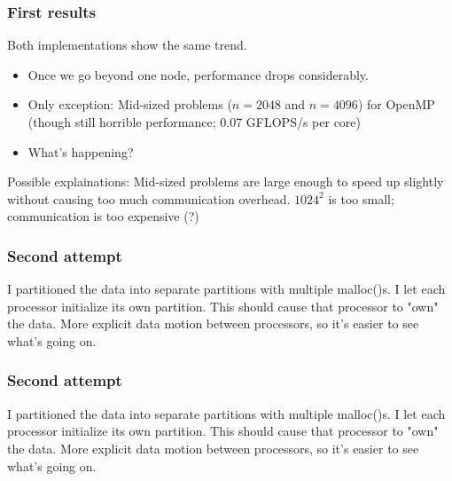 \documentclass{beamer}
\begin{document}
\begin{frame}
\frametitle{First results}
Both implementations show the same trend.
\pause
\begin{itemize}
\item Once we go beyond one node, performance drops considerably.
\pause
\item Only exception: Mid-sized problems ($n=2048$ and $n=4096$) for OpenMP (though still horrible performance; 0.07 GFLOPS/s per core)
\item What's happening?
\end{itemize}

Possible explainations: Mid-sized problems are large enough to speed up slightly without causing too much communication overhead.
\pause
$1024^2$ is too small; communication is too expensive (?)
\end{frame}

\begin{frame}
\frametitle{Second attempt}
I partitioned the data into separate partitions with multiple malloc()s.
\pause
I let each processor initialize its own partition. This should cause that processor to "own" the data.
\pause
More explicit data motion between processors, so it's easier to see what's going on.
\end{frame}

\begin{frame}
\frametitle{Second attempt}
I partitioned the data into separate partitions with multiple malloc()s.
\pause
I let each processor initialize its own partition. This should cause that processor to "own" the data.
\pause
More explicit data motion between processors, so it's easier to see what's going on.
\end{frame}
\end{document}
